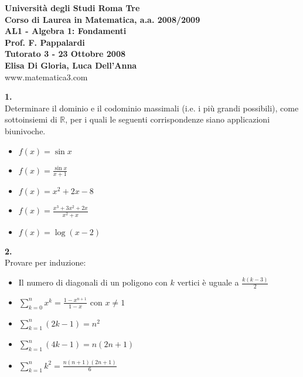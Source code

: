 \documentclass[italian,a4paper,11pt]
{article}
\newcommand{\R}{\mathbb{R}}
\begin{document}
\begin{center}

\textbf{Universit\`a degli Studi Roma Tre}\\

\textbf{Corso di Laurea in Matematica, a.a. 2008/2009}\\

\textbf{AL1 - Algebra 1: Fondamenti}\\

\textbf{Prof. F. Pappalardi}\\

\textbf{Tutorato 3 - 23 Ottobre 2008}\\

\textbf{Elisa Di Gloria, Luca Dell'Anna}\\

www.matematica3.com\\
\end{center}



\vspace{1cm}




\noindent
\begin{Ex}\textbf{ 1.}\\
Determinare il dominio e il codominio massimali (i.e. i pi\`u grandi possibili), come sottoinsiemi di $\R$, per i quali le seguenti corrispondenze siano applicazioni biunivoche.
\begin{itemize}
	\item $f(x)=\sin x$
	\item $f(x)=\frac{\sin x}{x+1}$
	\item $f(x)=x^2+2x-8$
	\item $f(x)=\frac{x^3+3x^2+2x}{x^2+x}$
	\item $f(x)=\log (x-2)$
\end{itemize}

\end{Ex}

\vspace{0.4cm}
\noindent
\begin{Ex}\textbf{ 2.}\\
Provare per induzione:
\begin{itemize}
	\item Il numero di diagonali di un poligono con $k$ vertici \`e uguale a $\frac{k(k-3)}{2}$
	\item $\displaystyle\sum_{k=0}^n x^k =\frac{1-x^{n+1}}{1-x}$ con  $x\neq1$
	\item $\displaystyle\sum_{k=1}^n (2k-1) = n^2$
	\item $\displaystyle\sum_{k=1}^n (4k-1) = n(2n+1)$
	\item $\displaystyle\sum_{k=1}^n k^2 = \frac{n(n+1)(2n+1)}{6}$
\end{itemize}
\end{Ex}
\end{document}
